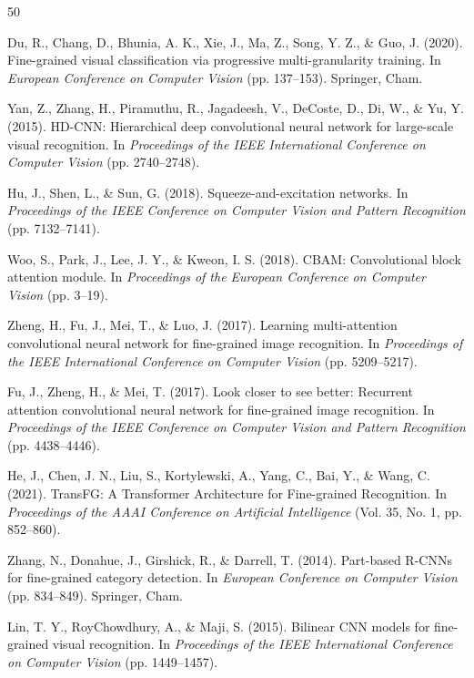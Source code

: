 \documentclass[pdflatex,sn-mathphys-num]{sn-jnl}
\theoremstyle{thmstyleone}%
\theoremstyle{thmstyletwo}%
\theoremstyle{thmstylethree}%
\begin{document}
\begin{thebibliography}{50}

     Du, R., Chang, D., Bhunia, A. K., Xie, J., Ma, Z., Song, Y. Z., \& Guo, J. (2020). Fine-grained visual classification via progressive multi-granularity training. In \textit{European Conference on Computer Vision} (pp. 137--153). Springer, Cham.

     Yan, Z., Zhang, H., Piramuthu, R., Jagadeesh, V., DeCoste, D., Di, W., \& Yu, Y. (2015). HD-CNN: Hierarchical deep convolutional neural network for large-scale visual recognition. In \textit{Proceedings of the IEEE International Conference on Computer Vision} (pp. 2740--2748).
    
     Hu, J., Shen, L., \& Sun, G. (2018). Squeeze-and-excitation networks. In \textit{Proceedings of the IEEE Conference on Computer Vision and Pattern Recognition} (pp. 7132--7141).
    
     Woo, S., Park, J., Lee, J. Y., \& Kweon, I. S. (2018). CBAM: Convolutional block attention module. In \textit{Proceedings of the European Conference on Computer Vision} (pp. 3--19).
    
     Zheng, H., Fu, J., Mei, T., \& Luo, J. (2017). Learning multi-attention convolutional neural network for fine-grained image recognition. In \textit{Proceedings of the IEEE International Conference on Computer Vision} (pp. 5209--5217).
    
     Fu, J., Zheng, H., \& Mei, T. (2017). Look closer to see better: Recurrent attention convolutional neural network for fine-grained image recognition. In \textit{Proceedings of the IEEE Conference on Computer Vision and Pattern Recognition} (pp. 4438--4446).
    
     He, J., Chen, J. N., Liu, S., Kortylewski, A., Yang, C., Bai, Y., \& Wang, C. (2021). TransFG: A Transformer Architecture for Fine-grained Recognition. In \textit{Proceedings of the AAAI Conference on Artificial Intelligence} (Vol. 35, No. 1, pp. 852--860).
    
     Zhang, N., Donahue, J., Girshick, R., \& Darrell, T. (2014). Part-based R-CNNs for fine-grained category detection. In \textit{European Conference on Computer Vision} (pp. 834--849). Springer, Cham.
    
     Lin, T. Y., RoyChowdhury, A., \& Maji, S. (2015). Bilinear CNN models for fine-grained visual recognition. In \textit{Proceedings of the IEEE International Conference on Computer Vision} (pp. 1449--1457).
    

\end{thebibliography}
\end{document}
